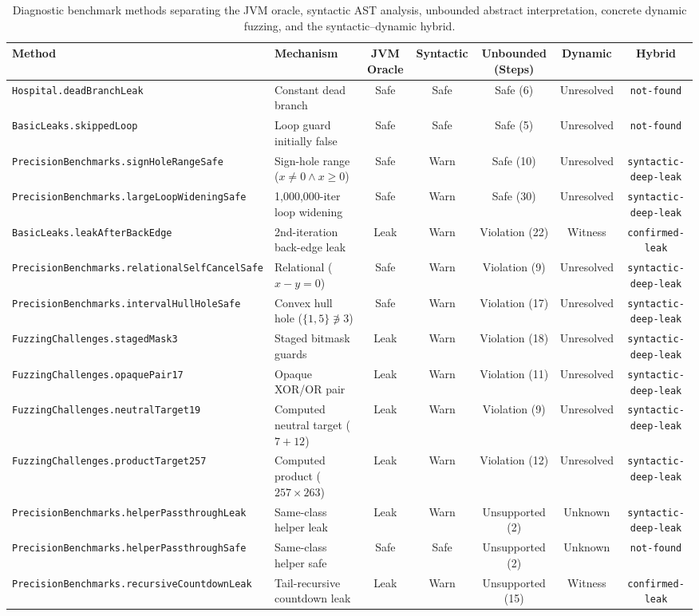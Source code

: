 \begin{table}[t]
\centering
\caption{Diagnostic benchmark methods separating the JVM oracle, syntactic AST analysis, unbounded abstract interpretation, concrete dynamic fuzzing, and the syntactic--dynamic hybrid.}
\label{tab:diagnostic-examples}
\small
\begin{tabular}{llccccc}
\toprule
Method & Mechanism & JVM Oracle & Syntactic & Unbounded (Steps) & Dynamic & Hybrid \\
\midrule
\texttt{Hospital.deadBranchLeak} & Constant dead branch & Safe & Safe & Safe (6) & Unresolved & \texttt{not-found} \\
\texttt{BasicLeaks.skippedLoop} & Loop guard initially false & Safe & Safe & Safe (5) & Unresolved & \texttt{not-found} \\
\texttt{PrecisionBenchmarks.signHoleRangeSafe} & Sign-hole range ($x \neq 0 \land x \ge 0$) & Safe & Warn & Safe (10) & Unresolved & \texttt{syntactic-deep-leak} \\
\texttt{PrecisionBenchmarks.largeLoopWideningSafe} & 1,000,000-iter loop widening & Safe & Warn & Safe (30) & Unresolved & \texttt{syntactic-deep-leak} \\
\texttt{BasicLeaks.leakAfterBackEdge} & 2nd-iteration back-edge leak & Leak & Warn & Violation (22) & Witness & \texttt{confirmed-leak} \\
\texttt{PrecisionBenchmarks.relationalSelfCancelSafe} & Relational ($x - y = 0$) & Safe & Warn & Violation (9) & Unresolved & \texttt{syntactic-deep-leak} \\
\texttt{PrecisionBenchmarks.intervalHullHoleSafe} & Convex hull hole ($\{1,5\} \not\ni 3$) & Safe & Warn & Violation (17) & Unresolved & \texttt{syntactic-deep-leak} \\
\texttt{FuzzingChallenges.stagedMask3} & Staged bitmask guards & Leak & Warn & Violation (18) & Unresolved & \texttt{syntactic-deep-leak} \\
\texttt{FuzzingChallenges.opaquePair17} & Opaque XOR/OR pair & Leak & Warn & Violation (11) & Unresolved & \texttt{syntactic-deep-leak} \\
\texttt{FuzzingChallenges.neutralTarget19} & Computed neutral target ($7+12$) & Leak & Warn & Violation (9) & Unresolved & \texttt{syntactic-deep-leak} \\
\texttt{FuzzingChallenges.productTarget257} & Computed product ($257 \times 263$) & Leak & Warn & Violation (12) & Unresolved & \texttt{syntactic-deep-leak} \\
\texttt{PrecisionBenchmarks.helperPassthroughLeak} & Same-class helper leak & Leak & Warn & Unsupported (2) & Unknown & \texttt{syntactic-deep-leak} \\
\texttt{PrecisionBenchmarks.helperPassthroughSafe} & Same-class helper safe & Safe & Safe & Unsupported (2) & Unknown & \texttt{not-found} \\
\texttt{PrecisionBenchmarks.recursiveCountdownLeak} & Tail-recursive countdown leak & Leak & Warn & Unsupported (15) & Witness & \texttt{confirmed-leak} \\
\bottomrule
\end{tabular}
\end{table}

